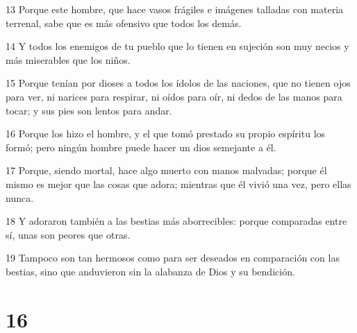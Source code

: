 \par 13 Porque este hombre, que hace vasos frágiles e imágenes talladas con materia terrenal, sabe que es más ofensivo que todos los demás.
\par 14 Y todos los enemigos de tu pueblo que lo tienen en sujeción son muy necios y más miserables que los niños.
\par 15 Porque tenían por dioses a todos los ídolos de las naciones, que no tienen ojos para ver, ni narices para respirar, ni oídos para oír, ni dedos de las manos para tocar; y sus pies son lentos para andar.
\par 16 Porque los hizo el hombre, y el que tomó prestado su propio espíritu los formó; pero ningún hombre puede hacer un dios semejante a él.
\par 17 Porque, siendo mortal, hace algo muerto con manos malvadas; porque él mismo es mejor que las cosas que adora; mientras que él vivió una vez, pero ellas nunca.
\par 18 Y adoraron también a las bestias más aborrecibles: porque comparadas entre sí, unas son peores que otras.
\par 19 Tampoco son tan hermosos como para ser deseados en comparación con las bestias, sino que anduvieron sin la alabanza de Dios y su bendición.

\chapter{16}

